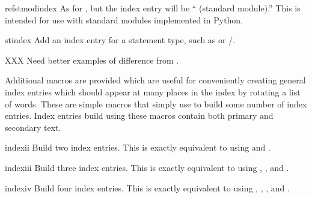 \documentclass{howto}
\begin{document}
    \begin{macrodesc}{refstmodindex}{}
      As for , but the index entry will be
      `` (standard module).''  This is intended for use
      with standard modules implemented in Python.
    \end{macrodesc}

    \begin{macrodesc}{stindex}{}
      Add an index entry for a statement type, such as 
      or /.

      XXX Need better examples of difference from .
    \end{macrodesc}


    Additional macros are provided which are useful for conveniently
    creating general index entries which should appear at many places
    in the index by rotating a list of words.  These are simple macros
    that simply use  to build some number of index
    entries.  Index entries build using these macros contain both
    primary and secondary text.

    \begin{macrodesc}{indexii}{}
      Build two index entries.  This is exactly equivalent to using
       and 
      .
    \end{macrodesc}

    \begin{macrodesc}{indexiii}{}
      Build three index entries.  This is exactly equivalent to using
      ,
      , and
      .
    \end{macrodesc}

    \begin{macrodesc}{indexiv}{}
      Build four index entries.  This is exactly equivalent to using
      ,
      ,
      ,
      and
      .
    \end{macrodesc}
\end{document}
